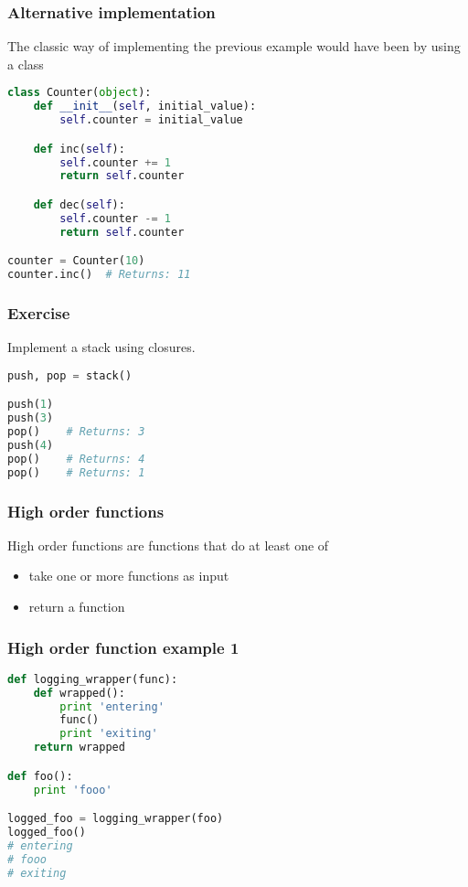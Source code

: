 \documentclass{beamer}
\begin{document}
\begin{frame}[fragile]
\frametitle{Alternative implementation}
The classic way of implementing the previous example
would have been by using a class

\vspace{5 mm}
\begin{lstlisting}[language=python]
class Counter(object):
    def __init__(self, initial_value):
        self.counter = initial_value

    def inc(self):
        self.counter += 1
        return self.counter

    def dec(self):
        self.counter -= 1
        return self.counter

counter = Counter(10)
counter.inc()  # Returns: 11
\end{lstlisting}
\end{frame}

\begin{frame}[fragile]
\frametitle{Exercise}
Implement a stack using closures.
\vspace{5 mm}
\begin{lstlisting}[language=python]
push, pop = stack()

push(1)
push(3)
pop()    # Returns: 3
push(4)
pop()    # Returns: 4
pop()    # Returns: 1
\end{lstlisting}
\end{frame}

\begin{frame}[fragile]
\frametitle{High order functions}
High order functions are functions that do at least one of
\begin{itemize}
  \item take one or more functions as input
  \item return a function
\end{itemize}
\end{frame}

\begin{frame}[fragile]
\frametitle{High order function example 1}
\begin{lstlisting}[language=python]
def logging_wrapper(func):
    def wrapped():
        print 'entering'
        func()
        print 'exiting'
    return wrapped

def foo():
    print 'fooo'

logged_foo = logging_wrapper(foo)
logged_foo()
# entering
# fooo
# exiting
\end{lstlisting}
\end{frame}
\end{document}
